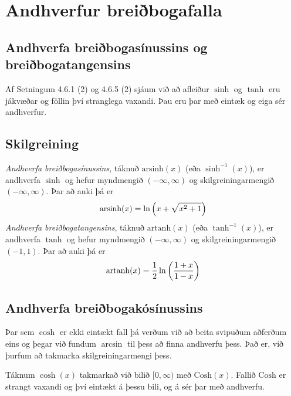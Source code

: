 \documentclass[a4paper,10pt,icelandic]{sphinxmanual}
\begin{document}
\section{Andhverfur breiðbogafalla}
\label{kafli04:andhverfur-breibogafalla}

\subsection{Andhverfa breiðbogasínussins og breiðbogatangensins}
\label{kafli04:andhverfa-breibogasinussins-og-breibogatangensins}
Af Setningum 4.6.1 (2) og 4.6.5 (2) sjáum við að afleiður \(\sinh\) og
\(\tanh\) eru jákvæðar og föllin því stranglega vaxandi. Þau eru þar
með eintæk og eiga sér andhverfur.


\subsection{Skilgreining}
\label{kafli04:id11}
\textit{Andhverfa breiðbogasínussins},
táknuð \({{\text{arsinh}}}(x)\) (eða
\(\sinh^{-1}(x)\)), er andhverfa \(\sinh\) og hefur myndmengið
\((-\infty,\infty)\) og skilgreiningarmengið
\((-\infty,\infty)\). Þar að auki þá er
\begin{gather}
\begin{split}{{\text{arsinh}}}(x) = \ln\left(x+\sqrt{x^2+1}\right)\end{split}\notag
\end{gather}
\textit{Andhverfa breiðbogatangensins},
táknuð \({{\text{artanh}}}(x)\)
(eða \(\tanh^{-1}(x)\)), er andhverfa \(\tanh\) og hefur
myndmengið \((-\infty,\infty)\) og skilgreiningarmengið
\((-1,1)\). Þar að auki þá er
\begin{gather}
\begin{split}{{\text{artanh}}}(x) = \frac 12 \ln\left(\frac{1+x}{1-x}\right)\end{split}\notag
\end{gather}

\subsection{Andhverfa breiðbogakósínussins}
\label{kafli04:index-6}\label{kafli04:andhverfa-breibogakosinussins}
Þar sem \(\cosh\) er ekki eintækt fall þá verðum við að beita
svipuðum aðferðum eins og þegar við fundum \(\arcsin\) til þess að
finna andhverfu þess.
Það er, við þurfum að takmarka skilgreiningarmengi
þess.

Táknum \(\cosh(x)\) takmarkað við bilið \([0,\infty)\) með
\({{\text{Cosh}}}(x)\). Fallið \({{\text{Cosh}}}\) er strangt
vaxandi og því eintækt á þessu bili, og á sér þar með andhverfu.
\end{document}
